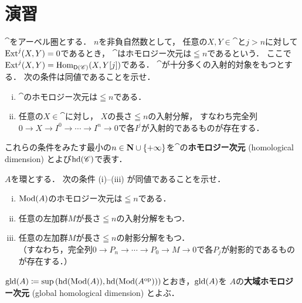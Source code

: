 \section*{演習}
\setcounter{EXC}{16}
\begin{leftbar}
\begin{EXC}[ホモロジー次元]\label{EXC116}
    \(\cat\)をアーベル圏とする．
    \(n\)を非負自然数として，
    任意の\(X,Y\in\cat\)と\(j>n\)に対して\(\mathop{\mathrm{Ext}}\nolimits^{j}(X,Y)=0\)であるとき，
    \(\cat\)はホモロジー次元は\(\leqq n\)であるという．
    ここで\(\mathop{\mathrm{Ext}}\nolimits^{j}(X,Y)=\mathop{\mathrm{Hom}}\nolimits_{\mathsf{D}(\mathscr{C})}(X,Y[j])\)である．
    \(\cat\)が十分多くの入射的対象をもつとする．
    次の条件は同値であることを示せ．    
    \begin{enumerate}[(i)]
        \item \(\cat\)のホモロジー次元は\(\leqq n\)である．
        \item 任意の\(X\in\cat\)に対し，
        \(X\)の長さ\(\leqq n\)の入射分解，
        すなわち完全列\(
            0\to X\to I^{0}\to \cdots\to I^{n}\to 0
        \)で各\(I^{j}\)が入射的であるものが存在する．
    \end{enumerate}
    
    これらの条件をみたす最小の\(
        n\in\mathbf{N}\cup\{+\infty\}
    \)を\(\cat\)の\textbf{ホモロジー次元} (homological 
    dimension) とよび\(\mathop{\mathrm{hd}}\nolimits(\mathscr{C})\)で表す．
\end{EXC}
\end{leftbar}


\setcounter{EXC}{27}

\begin{leftbar}
\begin{EXC}[大域ホモロジー次元]\label{EXC128}
    \(A\)を環とする．
    次の条件 (i)--(iii) が同値であることを示せ．    
    \begin{enumerate}[(i)]
        \item \(\mathop{\mathrm{Mod}}\nolimits(A)\)のホモロジー次元は\(\leqq n\)である．
        \item 任意の左加群\(M\)が長さ\(\leqq n\)の入射分解をもつ．
        \item 任意の左加群\(M\)が長さ\(\leqq n\)の射影分解をもつ．\\（すなわち，完全列\(0\to P_{n}\to \cdots\to P_{0}\to M\to 0\)で各\(P_j\)が射影的であるものが存在する．）
    \end{enumerate}
    
    \(
        \mathop{\mathrm{gld}}\nolimits(A)\coloneqq
        \sup\left(\mathop{\mathrm{hd}}\nolimits(\mathop{\mathrm{Mod}}\nolimits(A)),\mathop{\mathrm{hd}}\nolimits(\mathop{\mathrm{Mod}}\nolimits(A^{{\rm op}}))\right)
    \)とおき，\(\mathop{\mathrm{gld}}\nolimits(A)\)を
    \(A\)の\textbf{大域ホモロジー次元} (global 
    homological dimension) とよぶ．
\end{EXC}
\end{leftbar}


